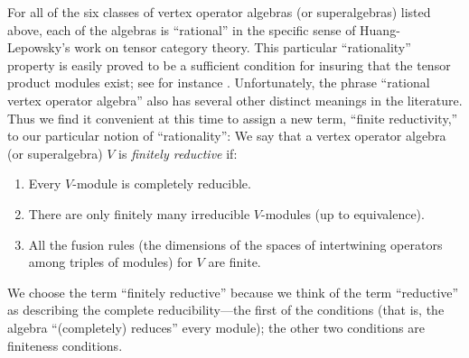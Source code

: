 \documentclass[12pt]{article}
\begin{document}
For all of the six classes of vertex operator algebras (or
superalgebras) listed above, each of the algebras is ``rational'' in
the specific sense of Huang-Lepowsky's work on tensor category theory.
This particular ``rationality'' property is easily proved to be a
sufficient condition for insuring that the tensor product modules
exist; see for instance \cite{tensor1}.  Unfortunately, the phrase
``rational vertex operator algebra'' also has several other distinct
meanings in the literature.  Thus we find it convenient at this time
to assign a new term, ``finite reductivity,'' to our particular notion
of ``rationality'': We say that a vertex operator algebra (or
superalgebra) $V$ is {\it finitely reductive} if:
\begin{enumerate}
\item Every $V$-module is completely reducible.
\item There are only finitely many irreducible $V$-modules (up to
equivalence).
\item All the fusion rules (the dimensions of the spaces of
intertwining operators among triples of modules) for $V$ are finite.
\end{enumerate}
We choose the term ``finitely reductive'' because we think of the term
``reductive'' as describing the complete reducibility---the first of
the conditions (that is, the algebra ``(completely) reduces'' every
module); the other two conditions are finiteness conditions.
\end{document}

